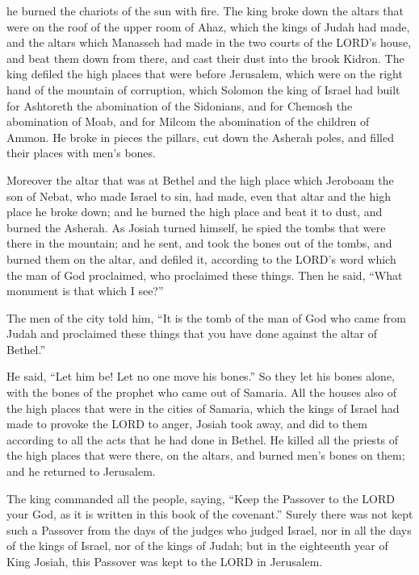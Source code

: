 he burned the chariots of the sun with fire.
\myverse{}The king broke down the altars that were on the roof of the upper room of
Ahaz, which the kings of Judah had made, and the altars which Manasseh had made in the two courts of the
LORD’s house, and beat them down from there, and cast their dust into the brook Kidron.
\myverse{}The king defiled the high places that were before Jerusalem, which were on
the right hand of the mountain of corruption, which Solomon the king of Israel had built for Ashtoreth
the abomination of the Sidonians, and for Chemosh the abomination of Moab, and for Milcom the abomination
of the children of Ammon.
\myverse{}He broke in pieces the pillars, cut down the Asherah poles, and filled their
places with men’s bones.

\myverse{}Moreover the altar that was at Bethel and the high place which
Jeroboam the son of Nebat, who made Israel to sin, had made, even that altar and the high place he broke
down; and he burned the high place and beat it to dust, and burned the Asherah.
\myverse{}As Josiah turned himself, he spied the tombs that were there in the mountain;
and he sent, and took the bones out of the tombs, and burned them on the altar, and defiled it, according
to the LORD’s word which the man of God proclaimed, who proclaimed these things.
\myverse{}Then he said, “What monument is that which I see?”

The men of the city told him, “It is the tomb of the man of God who came from Judah and proclaimed
these things that you have done against the altar of Bethel.”

\myverse{}He said, “Let him be! Let no one move his bones.” So they let
his bones alone, with the bones of the prophet who came out of Samaria.
\myverse{}All the houses also of the high places that were in the cities of Samaria,
which the kings of Israel had made to provoke the LORD to anger, Josiah took away, and did to them according
to all the acts that he had done in Bethel.
\myverse{}He killed all the priests of the high places that were there, on the altars,
and burned men’s bones on them; and he returned to Jerusalem.

\myverse{}The king commanded all the people, saying, “Keep the Passover
to the LORD your God, as it is written in this book of the covenant.”
\myverse{}Surely there was not kept such a Passover from the days of the judges who
judged Israel, nor in all the days of the kings of Israel, nor of the kings of Judah;
\myverse{}but in the eighteenth year of King Josiah, this Passover was kept to the
LORD in Jerusalem.

